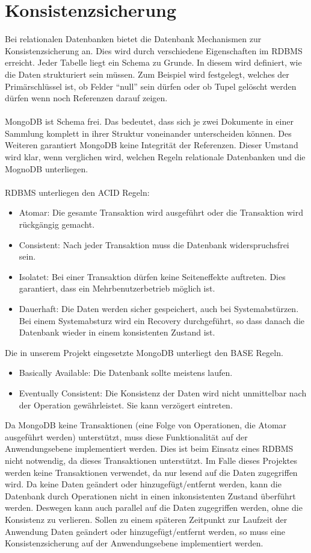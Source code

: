  \section{Konsistenzsicherung}
 Bei relationalen Datenbanken bietet die Datenbank Mechanismen zur
 Konsistenzsicherung an. Dies wird durch verschiedene Eigenschaften im RDBMS
 erreicht. Jeder Tabelle liegt ein Schema zu Grunde. In diesem wird definiert,
 wie die Daten strukturiert sein müssen. Zum Beispiel wird festgelegt, welches
 der Primärschlüssel ist, ob Felder ``null'' sein dürfen oder ob Tupel gelöscht
 werden dürfen wenn noch Referenzen darauf zeigen.
 \\\\
 MongoDB ist Schema frei. Das bedeutet, dass sich je zwei Dokumente in einer
 Sammlung  komplett in ihrer Struktur voneinander unterscheiden können.
 Des Weiteren garantiert MongoDB keine Integrität der Referenzen. Dieser Umstand
 wird klar, wenn verglichen wird, welchen Regeln relationale Datenbanken und
 die MognoDB unterliegen.
 \\\\
 \noindent
 RDBMS unterliegen den ACID Regeln:
 \begin{itemize}
   \item Atomar: Die gesamte Transaktion wird ausgeführt oder die Transaktion
   wird rückgängig gemacht.
   \item Consistent: Nach jeder Transaktion muss die Datenbank widerspruchsfrei
   sein.
   \item Isolatet: Bei einer Transaktion dürfen keine Seiteneffekte
   auftreten. Dies garantiert, dass ein Mehrbenutzerbetrieb möglich ist.
   \item Dauerhaft: Die Daten werden sicher gespeichert, auch bei
   Systemabstürzen. Bei einem Systemabsturz wird ein Recovery durchgeführt, so 
   dass danach die Datenbank wieder in einem konsistenten Zustand ist.
 \end{itemize}
 Die in unserem Projekt eingesetzte MongoDB unterliegt den BASE Regeln.
 \begin{itemize}
   \item Basically Available: Die Datenbank sollte meistens laufen.
   \item Eventually Consistent: Die Konsistenz der Daten wird nicht unmittelbar
   nach der Operation gewährleistet. Sie kann verzögert eintreten.
\end{itemize}
\noindent
Da MongoDB keine Transaktionen (eine Folge von Operationen, die Atomar
ausgeführt werden) unterstützt, muss diese Funktionalität auf der
Anwendungsebene implementiert werden. Dies ist beim Einsatz eines RDBMS nicht
notwendig, da dieses Transaktionen unterstützt. Im Falle dieses Projektes werden keine
Transaktionen verwendet, da nur lesend auf die Daten zugegriffen wird.
Da keine Daten geändert oder hinzugefügt/entfernt werden,
kann die Datenbank durch Operationen nicht in einen inkonsistenten Zustand
überführt werden. Deswegen kann auch parallel auf die Daten zugegriffen
werden, ohne die Konsistenz zu verlieren. Sollen zu einem späteren Zeitpunkt zur
Laufzeit der Anwendung Daten geändert oder hinzugefügt/entfernt werden,
 so muss eine Konsistenzsicherung auf der Anwendungsebene  implementiert werden.


 

		